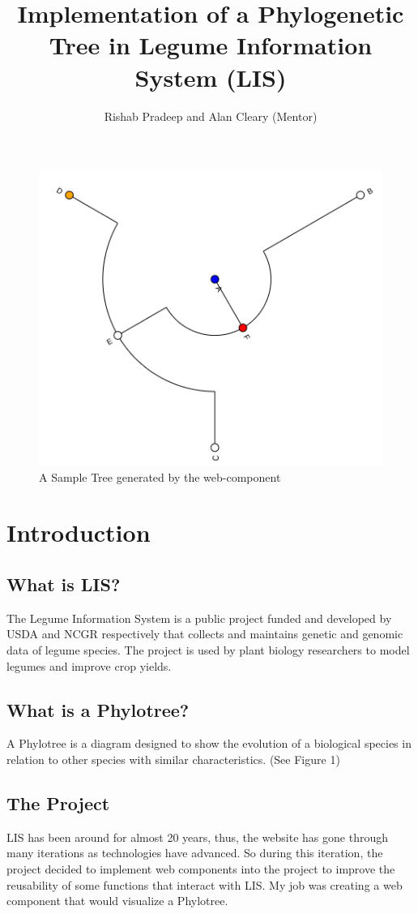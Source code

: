 \documentclass[twoside,twocolumn]{article}
\title{Implementation of a Phylogenetic Tree in Legume Information System (LIS)
}
\author{Rishab Pradeep and Alan Cleary (Mentor)}
\begin{document}
	\maketitle
	\begin{figure}
		\centering
		\includegraphics[width=0.7\linewidth]{imgs/phylotee}
		\caption{A Sample Tree generated by the web-component}
		\label{fig:phylotee}
	\end{figure}
	
	
	\section{Introduction}
	\subsection{What is LIS?}
	The Legume Information System is a public project funded and developed by USDA and NCGR respectively that collects and maintains genetic and genomic data of legume species. The project is used by plant biology researchers to model legumes and improve crop yields.
	\subsection{What is a Phylotree?}
	A Phylotree is a diagram designed to show the evolution of a biological species in relation to other species with similar characteristics. (See Figure 1)
	\subsection{The Project}
	LIS has been around for almost 20 years, thus, the website has gone through many iterations as technologies have advanced. So during this iteration, the project decided to implement web components into the project to improve the reusability of some functions that interact with LIS. My job was creating a web component that would visualize a Phylotree.
\end{document}
